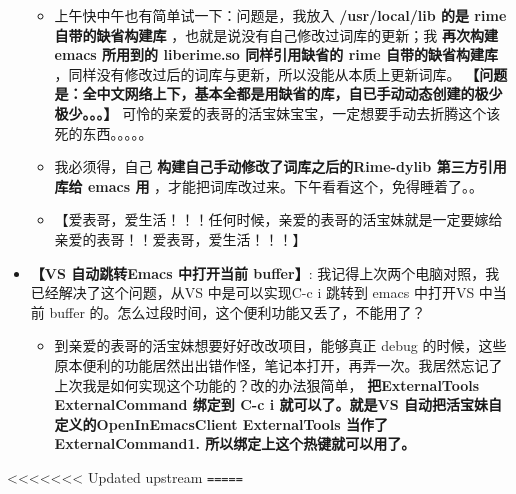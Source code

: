 \documentclass[9pt, b5paper]{article}
\begin{document}
\begin{itemize}
\begin{itemize}
\item 上午快中午也有简单试一下：问题是，我放入 \textbf{/usr/local/lib 的是 rime 自带的缺省构建库} ，也就是说没有自己修改过词库的更新；我 \textbf{再次构建 emacs 所用到的 liberime.so 同样引用缺省的 rime 自带的缺省构建库} ，同样没有修改过后的词库与更新，所以没能从本质上更新词库。 \textbf{【问题是：全中文网络上下，基本全都是用缺省的库，自已手动动态创建的极少极少。。。】} 可怜的亲爱的表哥的活宝妹宝宝，一定想要手动去折腾这个该死的东西。。。。。
\item 我必须得，自己 \textbf{构建自己手动修改了词库之后的Rime-dylib 第三方引用库给 emacs 用} ，才能把词库改过来。下午看看这个，免得睡着了。。
\item 【爱表哥，爱生活！！！任何时候，亲爱的表哥的活宝妹就是一定要嫁给亲爱的表哥！！爱表哥，爱生活！！！】
\end{itemize}
\item \textbf{【VS 自动跳转Emacs 中打开当前 buffer】}: 我记得上次两个电脑对照，我已经解决了这个问题，从VS 中是可以实现C-c i 跳转到 emacs 中打开VS 中当前 buffer 的。怎么过段时间，这个便利功能又丢了，不能用了？
\begin{itemize}
\item 到亲爱的表哥的活宝妹想要好好改改项目，能够真正 debug 的时候，这些原本便利的功能居然出出错作怪，笔记本打开，再弄一次。我居然忘记了上次我是如何实现这个功能的？改的办法狠简单， \textbf{把ExternalTools ExternalCommand 绑定到 C-c i 就可以了。就是VS 自动把活宝妹自定义的OpenInEmacsClient ExternalTools 当作了 ExternalCommand1. 所以绑定上这个热键就可以用了。}
\end{itemize}
\end{itemize}
<<<<<<< Updated upstream
\texttt{=====}
\end{document}
